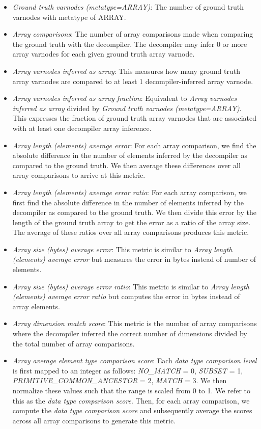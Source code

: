 \documentclass[conference]{IEEEtran}
\begin{document}
\begin{itemize}
    \item \emph{Ground truth varnodes (metatype=ARRAY)}: The number of ground truth varnodes with metatype of ARRAY.
    \item \emph{Array comparisons}: The number of array comparisons made when comparing the ground truth with the decompiler. The decompiler may infer 0 or more array varnodes for each given ground truth array varnode.
    \item \emph{Array varnodes inferred as array}: This measures how many ground truth array varnodes are compared to at least 1 decompiler-inferred array varnode.
    \item \emph{Array varnodes inferred as array fraction}: Equivalent to \emph{Array varnodes inferred as array} divided by \emph{Ground truth varnodes (metatype=ARRAY)}. This expresses the fraction of ground truth array varnodes that are associated with at least one decompiler array inference.
    \item \emph{Array length (elements) average error}: For each array comparison, we find the absolute difference in the number of elements inferred by the decompiler as compared to the ground truth. We then average these differences over all array comparisons to arrive at this metric.
    \item \emph{Array length (elements) average error ratio}: For each array comparison, we first find the absolute difference in the number of elements inferred by the decompiler as compared to the ground truth. We then divide this error by the length of the ground truth array to get the error as a ratio of the array size. The average of these ratios over all array comparisons produces this metric.
    \item \emph{Array size (bytes) average error}: This metric is similar to \emph{Array length (elements) average error} but measures the error in bytes instead of number of elements.
    \item \emph{Array size (bytes) average error ratio}: This metric is similar to \emph{Array length (elements) average error ratio} but computes the error in bytes instead of array elements.
    \item \emph{Array dimension match score}: This metric is the number of array comparisons where the decompiler inferred the correct number of dimensions divided by the total number of array comparisons.
    \item \emph{Array average element type comparison score}: Each \emph{data type comparison level} is first mapped to an integer as follows: \emph{NO\_MATCH} = 0, \emph{SUBSET} = 1, \emph{PRIMITIVE\_COMMON\_ANCESTOR} = 2, \emph{MATCH} = 3. We then normalize these values such that the range is scaled from 0 to 1. We refer to this as the \emph{data type comparison score}. Then, for each array comparison, we compute the \emph{data type comparison score} and subsequently average the scores across all array comparisons to generate this metric.
\end{itemize}
\end{document}
